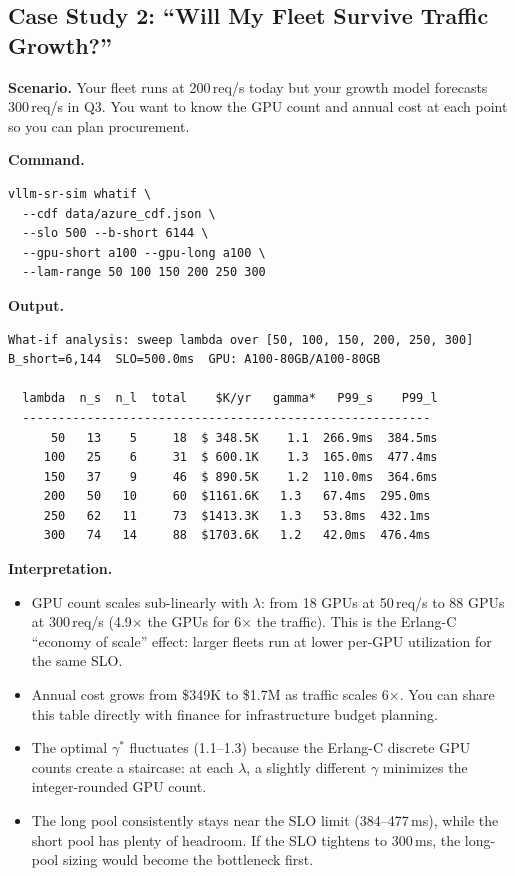 \documentclass[11pt,a4paper]{article}
\begin{document}
\subsection{Case Study 2: ``Will My Fleet Survive Traffic Growth?''}
\label{sec:cs-whatif}

\textbf{Scenario.}  Your fleet runs at 200\,req/s today but your
growth model forecasts 300\,req/s in Q3.  You want to know the
GPU count and annual cost at each point so you can plan procurement.

\textbf{Command.}
\begin{lstlisting}[style=shell]
vllm-sr-sim whatif \
  --cdf data/azure_cdf.json \
  --slo 500 --b-short 6144 \
  --gpu-short a100 --gpu-long a100 \
  --lam-range 50 100 150 200 250 300
\end{lstlisting}

\textbf{Output.}
\begin{lstlisting}[style=output]
What-if analysis: sweep lambda over [50, 100, 150, 200, 250, 300]
B_short=6,144  SLO=500.0ms  GPU: A100-80GB/A100-80GB

  lambda  n_s  n_l  total    $K/yr   gamma*   P99_s    P99_l
  ---------------------------------------------------------
      50   13    5     18  $ 348.5K    1.1  266.9ms  384.5ms
     100   25    6     31  $ 600.1K    1.3  165.0ms  477.4ms
     150   37    9     46  $ 890.5K    1.2  110.0ms  364.6ms
     200   50   10     60  $1161.6K   1.3   67.4ms  295.0ms
     250   62   11     73  $1413.3K   1.3   53.8ms  432.1ms
     300   74   14     88  $1703.6K   1.2   42.0ms  476.4ms
\end{lstlisting}

\textbf{Interpretation.}
\begin{itemize}[nosep]
  \item GPU count scales sub-linearly with $\lambda$: from 18 GPUs
    at 50\,req/s to 88 GPUs at 300\,req/s (4.9$\times$ the GPUs
    for 6$\times$ the traffic).  This is the Erlang-C ``economy of
    scale'' effect: larger fleets run at lower per-GPU utilization
    for the same SLO.
  \item Annual cost grows from \$349K to \$1.7M as traffic scales
    6$\times$.  You can share this table directly with finance for
    infrastructure budget planning.
  \item The optimal $\gamma^*$ fluctuates (1.1--1.3) because the
    Erlang-C discrete GPU counts create a staircase: at each $\lambda$,
    a slightly different $\gamma$ minimizes the integer-rounded GPU count.
  \item The long pool consistently stays near the SLO limit (384--477\,ms),
    while the short pool has plenty of headroom.  If the SLO tightens
    to 300\,ms, the long-pool sizing would become the bottleneck first.
\end{itemize}
\end{document}
